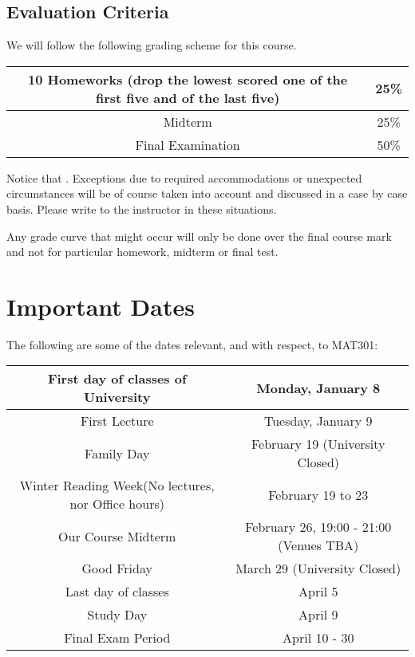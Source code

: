 \subsection{Evaluation Criteria}

We will follow the following grading scheme for this course.

\begin{table}[ht!]
    \centering
    \begin{tabular}{|c|c|}
        \hline
        10 Homeworks (drop the lowest scored one of the first five and of the last five) & 25\% \\
        \hline
        Midterm & 25\% \\
        \hline 
        Final Examination & 50\% \\
        \hline
    \end{tabular}
\end{table}

Notice that . Exceptions due to required accommodations or unexpected circumstances will be of course taken into account and discussed in a case by case basis. Please write to the instructor in these situations. 

Any grade curve that might occur will only be done over the final course mark and not for particular homework, midterm or final test.

\section{Important Dates}

The following are some of the dates relevant, and with respect, to MAT301:

\begin{table}[ht!]
    \begin{tabular}{|c|c|}
        \hline
        First day of classes of University & Monday, January 8 \\
        \hline
        First Lecture & Tuesday, January 9 \\
        \hline
        Family Day & February 19 (University Closed) \\
        \hline
        Winter Reading Week(No lectures, nor Office hours) & February 19 to 23 \\
        \hline
        Our Course Midterm & February 26, 19:00 - 21:00 (Venues TBA) \\
        \hline
        Good Friday & March 29 (University Closed) \\
        \hline
        Last day of classes & April 5 \\
        \hline
        Study Day & April 9 \\
        \hline
        Final Exam Period & April 10 - 30 \\
        \hline
    \end{tabular}
\end{table}

